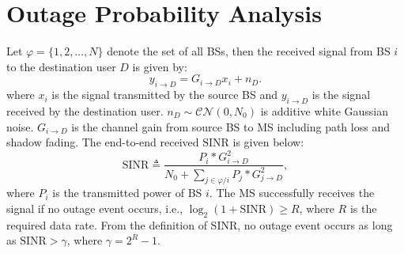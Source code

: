  \section{Outage Probability Analysis}
 \label{4:OutageProb}
 \par Let $\varphi = \{1, 2, \dots, N\}$ denote the set of all BSs, then the received signal from BS $i$ to the destination user $D$ is given by:
 \begin{equation}
 y_{i\to D} = G_{i\to D}x_{i}+n_{D}.
 \end{equation}
 where $x_{i}$ is the signal transmitted by the source BS and $y_{i\to D}$ is the signal received by the destination user. $n_{D}\sim \mathcal{CN}(0,N_{0})$ is additive white Gaussian noise. $G_{i\to D}$ is the channel gain from source BS to MS including path loss and shadow fading. The end-to-end received $\text{SINR}$ is given below:
 \begin{equation}
 \text{SINR} \triangleq \frac{P_{i}*G_{i\to D}^{2}}{N_{0}+\sum_{j\in \varphi/i}P_{j}*G_{j\to D}^2},
 \end{equation}
 where $P_{i}$ is the transmitted power of BS $i$. The MS successfully receives the signal if no outage event occurs, i.e., $\log_{2}(1+\text{SINR})\ge R$, where $R$ is the required data rate. From the definition of SINR, no outage event occurs as long as $\text{SINR} > \gamma$, where $\gamma = 2^{R}-1$.

